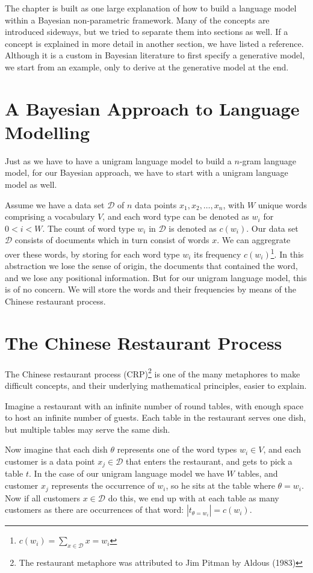 The chapter is built as one large explanation of how to build a language model within a Bayesian non-parametric framework. Many of the concepts are introduced sideways, but we tried to separate them into sections as well. If a concept is explained in more detail in another section, we have listed a reference. Although it is a custom in Bayesian literature to first specify a generative model, we start from an example, only to derive at the generative model at the end.

\section{A Bayesian Approach to Language Modelling}

Just as we have to have a unigram language model to build a $n$-gram language model, for our Bayesian approach, we have to start with a unigram language model as well.

Assume we have a data set $\mathcal{D}$ of $n$ data points $x_1, x_2, \ldots, x_n$, with $W$ unique words comprising a vocabulary $V$, and each word type can be denoted as $w_i$ for $0 < i < W$. The count of word type $w_i$ in $\mathcal{D}$ is denoted as $c(w_i)$. Our data set $\mathcal{D}$ consists of documents which in turn consist of words $x$. We can aggregrate over these words, by storing for each word type $
w_i$ its frequency $c(w_i)$\footnote{$c(w_i) = \sum_{x\in\mathcal{D}} x = w_i$}. In this abstraction we lose the sense of origin, the documents that contained the word, and we lose any positional information. But for our unigram language model, this is of no concern. We will store the words and their frequencies by means of the Chinese restaurant process.

\section{The Chinese Restaurant Process}
The Chinese restaurant process (CRP)\footnote{The restaurant metaphore was attributed to Jim Pitman by Aldous (1983)} is one of the many metaphores to make difficult concepts, and their underlying mathematical principles, easier to explain. 

Imagine a restaurant with an infinite number of round tables, with enough space to host an infinite number of guests. Each table in the restaurant serves one dish, but multiple tables may serve the same dish.

Now imagine that each dish $\theta$ represents one of the word types $w_i \in V$, and each customer is a data point $x_j\in\mathcal{D}$ that enters the restaurant, and gets to pick a table $t$. In the case of our unigram language model we have $W$ tables, and customer $x_j$ represents the occurrence of $w_i$, so he sits at the table where $\theta = 
w_i$. Now if all customers $x\in\mathcal{D}$ do this, we end up with at each table as many customers as there are occurrences of that word: $|t_{\theta = w_i}| = c(w_i)$.

